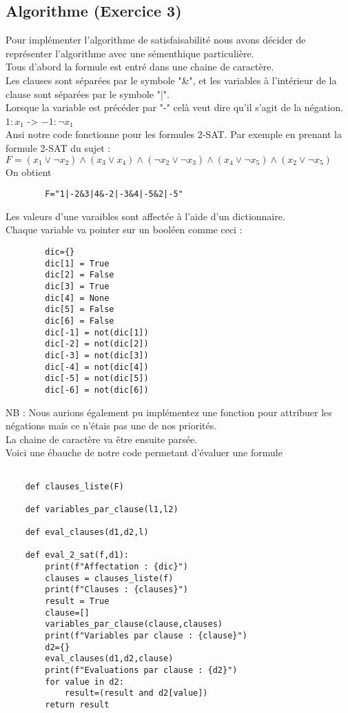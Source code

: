 \documentclass{article}
\begin{document}
    \subsection{Algorithme (Exercice 3)}
    Pour implémenter l'algorithme de satisfaisabilité nous avons décider de représenter l'algorithme avec une sémenthique particulière. \\
    Tous d'abord la formule est entré dans une chaine de caractère. \\
    Les clauses sont séparées par le symbole "\&", et les variables à l'intérieur de la clause sont séparées par le symbole "|". \\
    Lorsque la variable est précéder par "-" celà veut dire qu'il s'agit de la négation. \\
    $1 : x_1$ -> $-1 : \neg{x_1}$ \\
    Ansi notre code fonctionne pour les formules 2-SAT.
     Par exemple en prenant la formule 2-SAT du sujet : \\ $F=(x_1 \lor \neg x_2) \wedge (x_3 \lor x_4) \wedge (\neg x_2 \lor \neg x_3) \wedge (x_4 \lor \neg x_5) \wedge (x_2 \lor \neg x_5)$
     \\On obtient \begin{lstlisting}
        F="1|-2&3|4&-2|-3&4|-5&2|-5"
     \end{lstlisting}
     Les valeurs d'une varaibles sont affectée à l'aide d'un dictionnaire. \\
     Chaque variable va pointer sur un booléen comme ceci : 
     \begin{lstlisting}
        dic={}
        dic[1] = True
        dic[2] = False
        dic[3] = True
        dic[4] = None
        dic[5] = False
        dic[6] = False
        dic[-1] = not(dic[1])
        dic[-2] = not(dic[2])
        dic[-3] = not(dic[3])
        dic[-4] = not(dic[4])
        dic[-5] = not(dic[5])
        dic[-6] = not(dic[6])
     \end{lstlisting} 
     NB : Nous aurions également pu implémentez une fonction pour attribuer les négations mais ce n'étais pas une de nos priorités.\\
    La chaine de caractère va être ensuite parsée. \\
    Voici une ébauche de notre code permetant d'évaluer une formule 
    \begin{lstlisting}

    def clauses_liste(F)

    def variables_par_clause(l1,l2)

    def eval_clauses(d1,d2,l)

    def eval_2_sat(f,d1):
        print(f"Affectation : {dic}")
        clauses = clauses_liste(f)
        print(f"Clauses : {clauses}")
        result = True
        clause=[]
        variables_par_clause(clause,clauses)
        print(f"Variables par clause : {clause}")
        d2={}
        eval_clauses(d1,d2,clause)
        print(f"Evaluations par clause : {d2}")
        for value in d2:
            result=(result and d2[value])
        return result

    \end{lstlisting}
\end{document}
